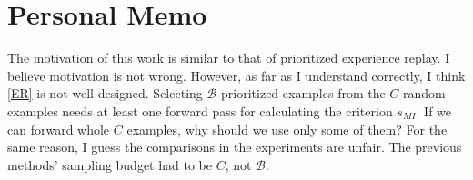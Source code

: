 \documentclass[10pt,twocolumn,letterpaper]{article}
\begin{document}
\section{Personal Memo}
The motivation of this work is similar to that of prioritized experience replay. I believe motivation is not wrong. However, as far as I understand correctly, I think \ref{ER} is not well designed. Selecting $\mathcal{B}$ prioritized examples from the $C$ random examples needs at least one forward pass for calculating the criterion $s_{MI}$. If we can forward whole $C$ examples, why should we use only some of them? For the same reason, I guess the comparisons in the experiments are unfair. The previous methods' sampling budget had to be $C$, not $\mathcal{B}$.
 



{\small

%
}
\end{document}
